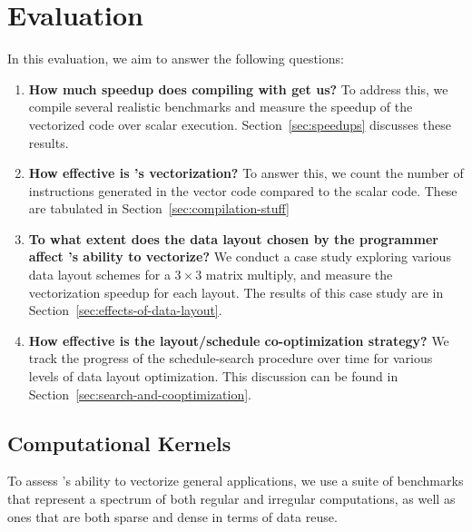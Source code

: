 \section{Evaluation}\label{sec:eval}


In this evaluation, we aim to answer the following questions:
\begin{enumerate}
    \item {\bf How much speedup does compiling with \system get us?} To address this, we compile several realistic benchmarks and measure the speedup of the vectorized code over scalar execution. Section~\ref{sec:speedups} discusses these results.
    \item {\bf How effective is \system's vectorization?} To answer this, we count the number of instructions generated in the vector code compared to the scalar code. These are tabulated in Section~\ref{sec:compilation-stuff}
    \item {\bf To what extent does the data layout chosen by the programmer affect \system's ability to vectorize?} We conduct a case study exploring various data layout schemes for a $3\times 3$ matrix multiply, and measure the vectorization speedup for each layout. The results of this case study are in Section~\ref{sec:effects-of-data-layout}.
    \item {\bf How effective is the layout/schedule co-optimization strategy?} We track the progress of the schedule-search procedure over time for various levels of data layout optimization. This discussion can be found in Section~\ref{sec:search-and-cooptimization}.
\end{enumerate}

\subsection{Computational Kernels}

To assess \system's ability to vectorize general applications, we use a suite of benchmarks that represent a spectrum of both regular and irregular computations, as well as ones that are both sparse and dense in terms of data reuse.

